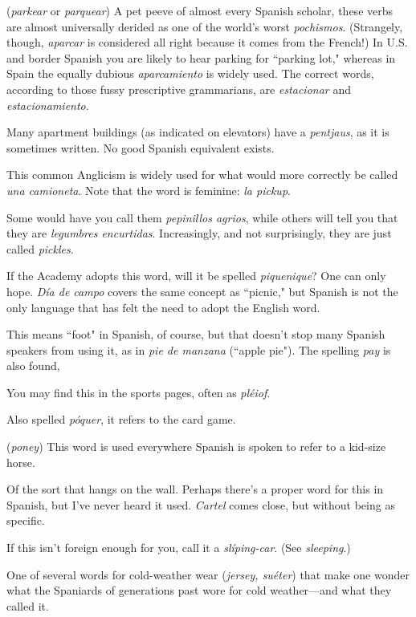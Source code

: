  (\emph{parkear} or \emph{parquear}) A pet peeve of almost every
Spanish scholar, these verbs are almost universally derided as one of
the world's worst \emph{pochismos}. (Strangely, though, \emph{aparcar} is considered
all right because it comes from the French!) In U.S. and border Spanish
you are likely to hear parking for ``parking lot," whereas in Spain the
equally dubious \emph{aparcamiento} is widely used. The correct words, according to those fussy prescriptive grammarians, are \emph{estacionar} and
\emph{estacionamiento}.

 Many apartment buildings (as indicated on elevators) have a \emph{pentjaus}, as it is sometimes written. No good Spanish
equivalent exists.

 This common Anglicism is widely used for what
would more correctly be called \emph{una camioneta}. Note that the word is
feminine: \emph{la pickup}.

 Some would have you call them \emph{pepinillos agrios},
while others will tell you that they are \emph{legumbres encurtidas}. Increasingly, and not surprisingly, they are just called \emph{pickles}.

 If the Academy adopts this word, will it be spelled \emph{piquenique}? One can only hope. \emph{Día de campo} covers the same concept
as ``picnic," but Spanish is not the only language that has felt the need
to adopt the English word.

 This means ``foot" in Spanish, of course, but that doesn't
stop many Spanish speakers from using it, as in \emph{pie de manzana}
(``apple pie"). The spelling \emph{pay} is also found,

 You may find this in the sports pages, often as
\emph{pléiof}.

 Also spelled \emph{póquer}, it refers to the card game.

 (\emph{poney}) This word is used everywhere Spanish is spoken to refer to a kid-size horse.

 Of the sort that hangs on the wall. Perhaps there's a
proper word for this in Spanish, but I've never heard it used. \emph{Cartel}
comes close, but without being as specific.

 If this isn't foreign enough for you, call it a \emph{slíping-car}. (See \emph{sleeping}.)

 One of several words for cold-weather wear (\emph{jersey, suéter}) that make one wonder what the Spaniards of generations
past wore for cold weather---and what they called it.

